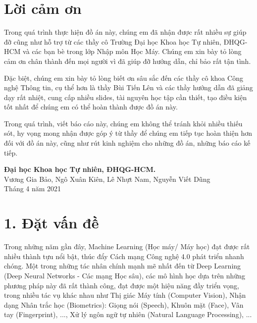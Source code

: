 \documentclass{article}
\begin{document}
	\section*{Lời cảm ơn}
	\vspace{1.0in}
	\begingroup
	\setlength{\parindent}{0pt}
	\qquad Trong quá trình thực hiện đồ án này, chúng em đã nhận được rất nhiều sự giúp đỡ cũng như hỗ trợ từ các thầy cô Trường Đại học Khoa học Tự nhiên, ĐHQG-HCM và các bạn bè trong lớp Nhập môn Học Máy. Chúng em xin bày tỏ lòng cảm ơn chân thành đến mọi người vì đã giúp đỡ hướng dẫn, chỉ bảo rất tận tình.
	
	\qquad Đặc biệt, chúng em xin bày tỏ lòng biết ơn sâu sắc đến các thầy cô khoa Công nghệ Thông tin, cụ thể hơn là thầy Bùi Tiến Lên và các thầy hướng dẫn đã giảng dạy rất nhiệt, cung cấp nhiều slides, tài nguyên học tập cần thiết, tạo điều kiện tốt nhất để chúng em có thể hoàn thành được đồ án này.
	
	\qquad Trong quá trình, viết báo cáo này, chúng em không thể tránh khỏi nhiều thiếu sót, hy vọng mong nhận được góp ý từ thầy để chúng em tiếp tục hoàn thiện hơn đối với đồ án này, cũng như rút kinh nghiệm cho những đồ án, những báo cáo kế tiếp.
		
	\vspace{1.0in}
	\textbf{Đại học Khoa học Tự nhiên, ĐHQG-HCM.}\\
	Vương Gia Bảo, Ngô Xuân Kiên, Lê Nhựt Nam, Nguyễn Viết Dũng\\
	Tháng 4 năm 2021\\
	\endgroup
	
	\newpage
	\tableofcontents
	\newpage
	\setcounter{secnumdepth}{0}
	
	\section{1. Đặt vấn đề}
	\qquad Trong những năm gần đây, Machine Learning (Học máy/ Máy học) đạt được rất nhiều thành tựu nổi bật, thúc đẩy Cách mạng Công nghệ 4.0 phát triển nhanh chóng. Một trong những tác nhân chính mạnh mẽ nhất đến từ Deep Learning (Deep Neural Networks - Các mạng Học sâu), các mô hình học dựa trên những phương pháp này đã rất thành công, đạt được một hiệu năng đầy triển vọng, trong nhiều tác vụ khác nhau như Thị giác Máy tính (Computer Vision), Nhận dạng Nhân trắc học (Biometrics): Giọng nói (Speech), Khuôn mặt (Face), Vân tay (Fingerprint), ..., Xử lý ngôn ngữ tự nhiên (Natural Language Processing), ...
	
\end{document}
